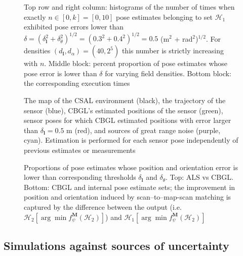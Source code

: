 \begin{figure}
  
  \caption{\small Top row and right column: histograms of the number of times
           when exactly $n \in [0,k] = [0,10]$ pose estimates belonging to set
           $\mathcal{H}_1$ exhibited pose errors lower than $\delta =
           (\delta_{\bm{l}}^2 + \delta_{\theta}^2)^{1/2} =  (0.3^2 +
           0.4^2)^{1/2} = 0.5$ (m$^2$ + rad$^2$)$^{1/2}$. For densities
           $(d_{\bm{l}},d_{\alpha}) = (40, 2^5)$ this number is strictly
           increasing with $n$. Middle block: percent proportion of pose
           estimates whose pose error is lower than $\delta$ for varying field
           densities.  Bottom block: the corresponding execution times}
  \label{fig:a:determine_40_32}
\end{figure}


\begin{figure}
  
  \caption{\small The map of the CSAL environment (black), the trajectory of
           the sensor (blue), CBGL's estimated positions of the sensor (green),
           sensor poses for which CBGL estimated positions with error larger
           than $\delta_{\bm{l}} = 0.5$ m (red), and sources of great range
           noise (purple, cyan). Estimation is performed for each sensor pose
           independently of previous estimates or measurements}
           \label{fig:a:map_and_trajectory}
\end{figure}

\begin{figure}
  
  \vspace{0.1cm}
  \caption{\small Proportions of pose estimates whose
           position and orientation error is lower than corresponding thresholds
           $\delta_{\bm{l}}$ and $\delta_{\theta}$. Top: ALS vs CBGL. Bottom:
           CBGL and internal pose estimate sets; the improvement in position
           and orientation induced by scan--to--map-scan matching is captured
           by the difference between the output (i.e.
           $\mathcal{H}_2[\arg \min f_{\psi}^{\bm{M}}(\mathcal{H}_2)]$) and
           $\mathcal{H}_1[\arg \min f_{\psi}^{\bm{M}}(\mathcal{H}_2)]$}
  \label{fig:a:awesomeness}
\end{figure}


\subsection{Simulations against sources of uncertainty}

